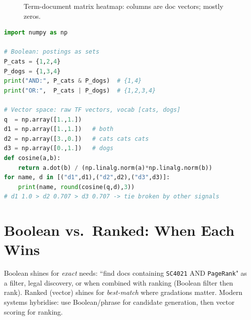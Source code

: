 \begin{figure}[h]\centering
{}
\caption{Term-document matrix heatmap: columns are doc vectors; mostly zeros.}
\label{fig:term-doc}
\end{figure}

\begin{lstlisting}[language=Python, caption={Boolean sets and cosine ranking on the same tiny collection.}, label={lst:boolean-cosine}]
import numpy as np

# Boolean: postings as sets
P_cats = {1,2,4}
P_dogs = {1,3,4}
print("AND:", P_cats & P_dogs)  # {1,4}
print("OR:",  P_cats | P_dogs)  # {1,2,3,4}

# Vector space: raw TF vectors, vocab [cats, dogs]
q  = np.array([1.,1.])
d1 = np.array([1.,1.])   # both
d2 = np.array([3.,0.])   # cats cats cats
d3 = np.array([0.,1.])   # dogs
def cosine(a,b):
    return a.dot(b) / (np.linalg.norm(a)*np.linalg.norm(b))
for name, d in [("d1",d1),("d2",d2),("d3",d3)]:
    print(name, round(cosine(q,d),3))
# d1 1.0 > d2 0.707 > d3 0.707 -> tie broken by other signals
\end{lstlisting}

\section{Boolean vs.\ Ranked: When Each Wins}\label{sec:compare}
Boolean shines for \emph{exact} needs: ``find docs containing \texttt{SC4021} AND \texttt{PageRank}" as a filter, legal discovery, or when combined with ranking (Boolean filter then rank). Ranked (vector) shines for \emph{best-match} where gradations matter. Modern systems hybridise: use Boolean/phrase for candidate generation, then vector scoring for ranking.

